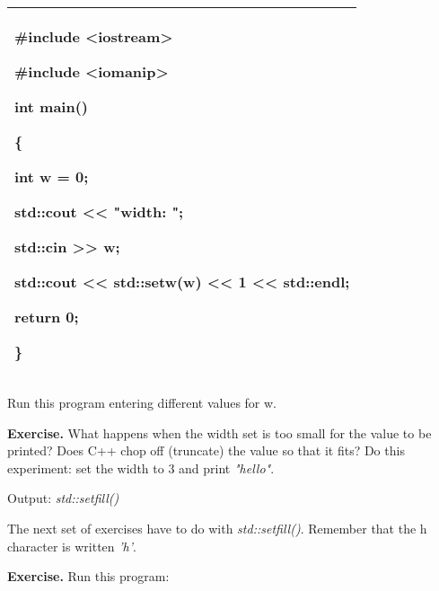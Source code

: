 \documentclass[
]{article}
\begin{document}
\begin{longtable}[]{@{}l@{}}
\toprule
\endhead
\begin{minipage}[t]{0.97\columnwidth}\raggedright
\#include \textless iostream\textgreater{}

\#include \textless iomanip\textgreater{}

int main()

\{

int w = 0;

std::cout \textless\textless{} "width: ";

std::cin \textgreater\textgreater{} w;

std::cout \textless\textless{} std::setw(\textbf{w})
\textless\textless{} 1 \textless\textless{} std::endl;

return 0;

\}\strut
\end{minipage}\tabularnewline
\bottomrule
\end{longtable}

Run this program entering different values for w.

\textbf{Exercise.} What happens when the width set is too small for the
value to be printed? Does C++ chop off (truncate) the value so that it
fits? Do this experiment: set the width to 3 and print \emph{"hello"}.

Output: \emph{std::setfill()}

The next set of exercises have to do with \emph{std::setfill()}.
Remember that the h character is written \emph{'h'}.

\textbf{Exercise.} Run this program:
\end{document}
